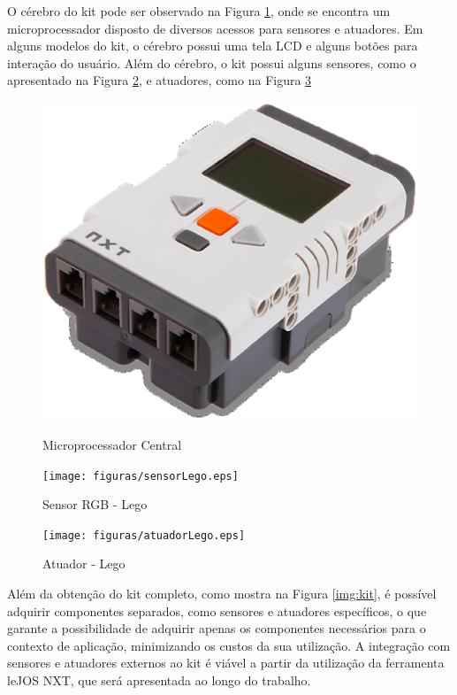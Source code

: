 O cérebro do kit pode ser observado na Figura \ref{img:cerebro}, onde se encontra um microprocessador disposto de diversos acessos para sensores e atuadores. Em alguns modelos do kit, o cérebro possui uma tela LCD e alguns botões para interação do usuário. Além do cérebro, o kit possui alguns sensores, como o apresentado na Figura \ref{img:sensorLego}, e atuadores, como na Figura \ref{img:atuadorLego}

\begin{figure}[H]
	\centering
	\includegraphics[scale=0.4]{figuras/brick.eps}
	\label{img:cerebro}
	\caption[Microprocessador Central]{Microprocessador Central}
\end{figure}

\begin{figure}[H]
	\centering
	\texttt{[image: figuras/sensorLego.eps]}
	\caption[Sensor RGB - Lego]{Sensor RGB - Lego}
	\label{img:sensorLego}
\end{figure}

\begin{figure}[H]
	\centering
	\texttt{[image: figuras/atuadorLego.eps]}
	\caption[Atuador - Lego]{Atuador - Lego}
	\label{img:atuadorLego}
\end{figure}

Além da obtenção do kit completo, como mostra na Figura \ref{img:kit}, é possível adquirir componentes separados, como sensores e atuadores específicos, o que garante a possibilidade de adquirir apenas os componentes necessários para o contexto de aplicação, minimizando os custos da sua utilização. A integração com sensores e atuadores externos ao kit é viável a partir da utilização da ferramenta leJOS NXT, que será apresentada ao longo do trabalho.

